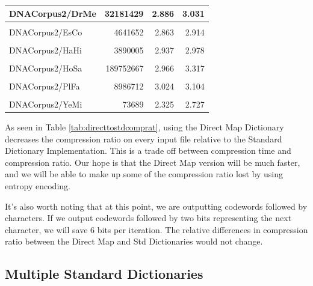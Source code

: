 \documentclass[12pt,twoside]{reedthesis}
\begin{document}
\begin{table}[!h]
{\begin{tabular}[t]{l|r|r|r}
\hline
DNACorpus2/DrMe & 32181429 & 2.886 & 3.031\\
\hline
\cellcolor{gray!6}{DNACorpus2/EnIn} & \cellcolor{gray!6}{26403087} & \cellcolor{gray!6}{2.938} & \cellcolor{gray!6}{3.067}\\
\hline
DNACorpus2/EsCo & 4641652 & 2.863 & 2.914\\
\hline
\cellcolor{gray!6}{DNACorpus2/GaGa} & \cellcolor{gray!6}{148532294} & \cellcolor{gray!6}{2.832} & \cellcolor{gray!6}{3.170}\\
\hline
DNACorpus2/HaHi & 3890005 & 2.937 & 2.978\\
\hline
\cellcolor{gray!6}{DNACorpus2/HePy} & \cellcolor{gray!6}{1667825} & \cellcolor{gray!6}{2.913} & \cellcolor{gray!6}{2.943}\\
\hline
DNACorpus2/HoSa & 189752667 & 2.966 & 3.317\\
\hline
\cellcolor{gray!6}{DNACorpus2/OrSa} & \cellcolor{gray!6}{43262523} & \cellcolor{gray!6}{2.882} & \cellcolor{gray!6}{3.058}\\
\hline
DNACorpus2/PlFa & 8986712 & 3.024 & 3.104\\
\hline
\cellcolor{gray!6}{DNACorpus2/ScPo} & \cellcolor{gray!6}{10652155} & \cellcolor{gray!6}{2.885} & \cellcolor{gray!6}{2.967}\\
\hline
DNACorpus2/YeMi & 73689 & 2.325 & 2.727\\
\hline
\end{tabular}}
\end{table}
As seen in Table \ref{tab:directtostdcomprat}, using the Direct Map Dictionary decreases the compression ratio on every input file relative to the Standard Dictionary Implementation. This is a trade off between compression time and compression ratio. Our hope is that the Direct Map version will be much faster, and we will be able to make up some of the compression ratio lost by using entropy encoding.

It's also worth noting that at this point, we are outputting codewords followed by characters. If we output codewords followed by two bits representing the next character, we will save 6 bits per iteration. The relative differences in compression ratio between the Direct Map and Std Dictionaries would not change.

\hypertarget{multiple-standard-dictionaries}{%
\subsection{Multiple Standard Dictionaries}\label{multiple-standard-dictionaries}}
\end{document}
